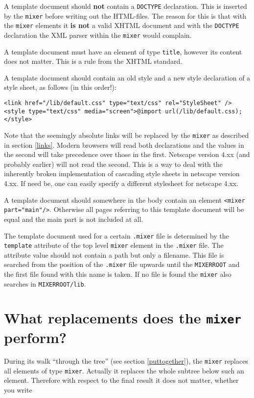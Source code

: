 \documentclass[a4paper,11pt]{article}
\newcommand{\mixer}{\texttt{mixer}}
\newcommand{\MIXERROOT}{\texttt{MIXERROOT}}
\begin{document}
A template document should \textbf{not} contain a \verb!DOCTYPE! declaration.
This is inserted by the {\mixer} before writing out the HTML-files. The 
reason for this is that with the \verb!mixer! elements it \textbf{is not}
a valid XHTML document and with the \verb!DOCTYPE! declaration the
XML parser within the {\mixer} would complain.

A template document must have an element of type \verb!title!, however
its content does not matter. This is a rule from the XHTML standard.

A template document should contain an old style and a new style declaration
of a style sheet, as follows (in this order!):

{\small
\begin{verbatim}
<link href="/lib/default.css" type="text/css" rel="StyleSheet" />
<style type="text/css" media="screen">@import url(/lib/default.css);</style>
\end{verbatim}}

Note that the seemingly absolute links will be replaced by the {\mixer}
as described in section \ref{links}. Modern browsers will read both
declarations and the values in the second will take precedence over
those in the first. Netscape version 4.xx (and probably earlier) will
not read the second. This is a way to deal with the inherently broken
implementation of cascading style sheets in netscape version 4.xx. If
need be, one can easily specify a different stylesheet for netscape
4.xx.

A template document should somewhere in the body contain an element
\verb!<mixer part="main"/>!. Otherwise all pages referring to this
template document will be equal and the main part is not included at all.

The template document used for a certain \verb!.mixer! file is determined
by the \verb!template! attribute of the top level \verb!mixer! element
in the \verb!.mixer! file. The attribute value should not contain a path
but only a filename. This file is searched from the position of the
\verb!.mixer! file upwards until the {\MIXERROOT} and the first file
found with this name is taken. If no file is found the {\mixer} also
searches in {\MIXERROOT}\verb!/lib!.


\section{What replacements does the {\mixer} perform?}

During its walk "`through the tree"' (see section \ref{puttogether}), the
{\mixer} replaces all elements of type \verb!mixer!. Actually it replaces
the whole subtree below such an element. Therefore with respect to the
final result it does not matter, whether you write
\end{document}
